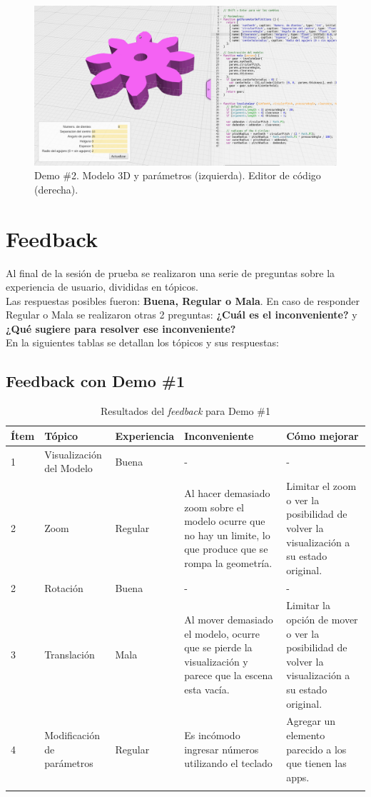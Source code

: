 \begin{figure}[ht]
    \includegraphics[width=14cm]{Img/Desarrollo/feedback00.jpg}
    \centering
    \caption{\footnotesize{Demo \#2. Modelo 3D y parámetros (izquierda). Editor de código (derecha).}}
     \label{fig:feedback00}
\end{figure}


\section{Feedback}
\label{feedback}

Al final de la sesión de prueba se realizaron una serie de preguntas sobre la experiencia de usuario, divididas en tópicos. \\ 
Las respuestas posibles fueron: \textbf{Buena, Regular o Mala}. En caso de responder Regular o Mala se realizaron otras 2 preguntas: \textbf{¿Cuál es el inconveniente?} y \textbf{¿Qué sugiere para resolver ese inconveniente?}\\ 
En la siguientes tablas se detallan los tópicos y sus respuestas:


\subsection{Feedback con Demo \#1}
\begin{longtable}{ |p{0.8cm}|p{2.3cm}|p{2.2cm}|p{3.6cm}|p{3.6cm}| }
\hline
     Ítem & Tópico & Experiencia  & Inconveniente & Cómo mejorar\\
\hline
1 & Visualización del Modelo & Buena & - & -\\
\hline
2 & Zoom & Regular & Al hacer demasiado zoom sobre el modelo ocurre que no hay un limite, lo que produce que se rompa la geometría. & Limitar el zoom o ver la posibilidad de volver la visualización a su estado original.
\\
\hline
2 & Rotación & Buena & - & -\\
\hline
3 & Translación & Mala & Al mover demasiado el modelo, ocurre que se pierde la visualización y parece que la escena esta vacía. & Limitar la opción de mover o ver la posibilidad de volver la visualización a su estado original.
\\
\hline
4 & Modificación de parámetros & Regular & Es incómodo ingresar números utilizando el teclado & Agregar un elemento parecido a los que tienen las apps.\\
\hline
\caption{\footnotesize{Resultados del \textit{feedback} para Demo \#1}}
\end{longtable}


